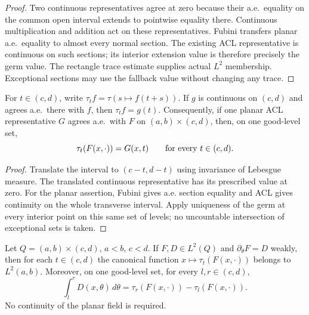 \begin{proof}
\leanok
Two continuous representatives agree at zero because their a.e.\ equality
on the common open interval extends to pointwise equality there.
Continuous multiplication and addition act on these representatives.
Fubini transfers planar a.e.\ equality to almost every normal section.
The existing ACL representative is continuous on such sections; its interior
extension value is therefore precisely the germ value.
The rectangle trace estimate supplies actual $L^2$ membership.
Exceptional sections may use the fallback value without changing any trace.
\end{proof}

\begin{lemma}
\label{lem:interior-trace-at}
\leanok
For $t\in(c,d)$, write
$\tau_t f=\tau(s\mapsto f(t+s))$.
If $g$ is continuous on $(c,d)$ and agrees a.e.\ there with $f$,
then $\tau_t f=g(t)$.
Consequently, if one planar ACL representative $G$ agrees a.e.\ with $F$
on $(a,b)\times(c,d)$, then, on one good-level set,
\[
 \tau_t(F(x,\cdot))=G(x,t)\qquad\hbox{for every }t\in(c,d).
\]
\end{lemma}

\begin{proof}
\leanok
Translate the interval to $(c-t,d-t)$ using invariance of Lebesgue measure.
The translated continuous representative has its prescribed value at zero.
For the planar assertion, Fubini gives a.e. section equality and ACL gives
continuity on the whole transverse interval.
Apply uniqueness of the germ at every interior point on this same set of levels;
no uncountable intersection of exceptional sets is taken.
\end{proof}

\begin{lemma}
\label{lem:canonical-transverse-trace}
\leanok
Let $Q=(a,b)\times(c,d)$, $a<b$, $c<d$.
If $F,D\in L^2(Q)$ and $\partial_\theta F=D$ weakly, then for each
$t\in(c,d)$ the canonical function $x\mapsto\tau_t(F(x,\cdot))$ belongs
to $L^2(a,b)$. Moreover, on one good-level set, for every $l,r\in(c,d)$,
\[
 \int_l^rD(x,\theta)\,d\theta
   =\tau_r(F(x,\cdot))-\tau_l(F(x,\cdot)).
\]
No continuity of the planar field is required.
\end{lemma}

